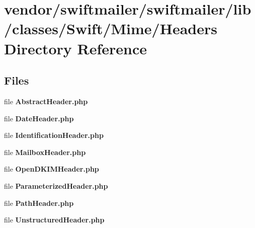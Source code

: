 \section{vendor/swiftmailer/swiftmailer/lib/classes/\+Swift/\+Mime/\+Headers Directory Reference}
\label{dir_b5f186ce819fdc207e45c1341a8277cd}
\subsection*{Files}
\begin{DoxyCompactItemize}
\item 
file {\bf Abstract\+Header.\+php}
\item 
file {\bf Date\+Header.\+php}
\item 
file {\bf Identification\+Header.\+php}
\item 
file {\bf Mailbox\+Header.\+php}
\item 
file {\bf Open\+D\+K\+I\+M\+Header.\+php}
\item 
file {\bf Parameterized\+Header.\+php}
\item 
file {\bf Path\+Header.\+php}
\item 
file {\bf Unstructured\+Header.\+php}
\end{DoxyCompactItemize}

